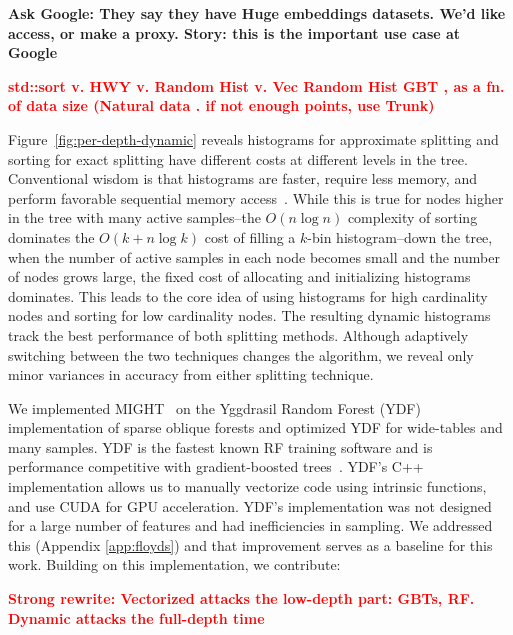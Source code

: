 \documentclass[sigconf]{acmart}
\newcommand{\TODO}[1]{\textbf{\textcolor{red}{#1}}}
\begin{document}
\textbf{Ask Google: They say they have Huge embeddings datasets.  We'd like access, or make a proxy. Story: this is the important use case at Google}

\TODO{
std::sort v. HWY v. Random Hist v. Vec Random Hist GBT , as a fn. of data size (Natural data . if not enough points, use Trunk)
}

Figure~\ref{fig:per-depth-dynamic} reveals histograms for approximate splitting and sorting for exact splitting have different costs at different levels in the tree. Conventional wisdom is that histograms are faster, require less memory, and perform favorable sequential memory access~\cite{ydf,prokhorenkova2018catboost}.
While this is true for nodes higher in the tree with many active samples--the $O(n\log n)$ complexity of sorting dominates the $O(k+n\log k)$ cost of filling a $k$-bin histogram--down the tree, when the number of active samples in each node becomes small and the number of nodes grows large, the fixed cost of allocating and initializing histograms dominates. This leads to the core idea of using histograms for high cardinality nodes and sorting for low cardinality nodes. The resulting dynamic histograms track the best performance of both splitting methods. Although adaptively switching between the two techniques changes the algorithm, we reveal only minor variances in accuracy from either splitting technique. 


We implemented MIGHT~\cite{might1,might2} on the Yggdrasil Random Forest (YDF)~\cite{ydf} implementation of sparse oblique forests and optimized YDF for wide-tables and many samples.
YDF is the fastest known RF training software and is performance competitive with gradient-boosted trees~\cite{ydf}. YDF's C++ implementation allows us to manually vectorize code using intrinsic functions, and use CUDA for GPU acceleration. YDF's implementation was not designed for a large number of features and had inefficiencies in sampling. We addressed this (Appendix \ref{app:floyds}) and that improvement serves as a baseline for this work. Building on this implementation, we contribute:

\TODO{Strong rewrite: Vectorized attacks the low-depth part: GBTs, RF. Dynamic attacks the full-depth time}
\end{document}
